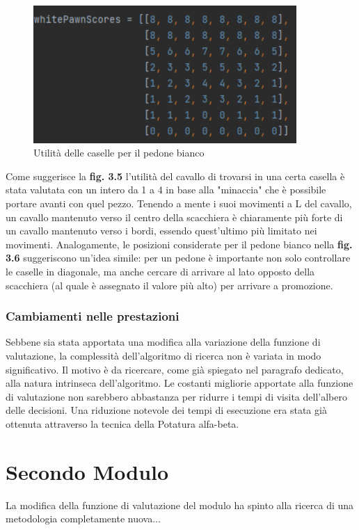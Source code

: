 \begin{figure}[!htb]
    \includegraphics[width=10cm]{frontmatter/figure/pedone.pdf}
    \centering
    \caption{Utilità delle caselle per il pedone bianco}
    \label{fig:valore_pezzi}
\end{figure}
Come suggerisce la \textbf{fig. 3.5} l'utilità del cavallo di trovarsi in una certa casella è stata valutata con un intero da 1 a 4 in base alla "minaccia" che è possibile portare avanti con quel pezzo. Tenendo a mente i suoi movimenti a L del cavallo, un cavallo mantenuto verso il centro della scacchiera è chiaramente più forte di un cavallo mantenuto verso i bordi, essendo quest'ultimo più limitato nei movimenti. Analogamente, le posizioni considerate per il pedone bianco nella \textbf{fig. 3.6} suggeriscono un'idea simile: per un pedone è importante non solo controllare le caselle in diagonale, ma anche cercare di arrivare al lato opposto della scacchiera (al quale è assegnato il valore più alto) per arrivare a promozione. 

\subsubsection{Cambiamenti nelle prestazioni}
Sebbene sia stata apportata una modifica alla variazione della funzione di valutazione, la complessità dell'algoritmo di ricerca non è variata in modo significativo. Il motivo è da ricercare, come già spiegato nel paragrafo dedicato, alla natura intrinseca dell'algoritmo. Le costanti migliorie apportate alla funzione di valutazione non sarebbero abbastanza per ridurre i tempi di visita dell'albero delle decisioni. Una riduzione notevole dei tempi di esecuzione era stata già ottenuta attraverso la tecnica della Potatura alfa-beta.

\section{Secondo Modulo}
La modifica della funzione di valutazione del modulo ha spinto alla ricerca di una metodologia completamente nuova...%

\newpage
